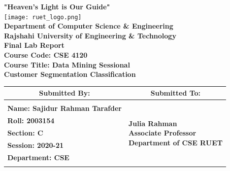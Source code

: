 \documentclass[12pt,a4paper]{article}
\begin{document}

\begin{titlepage}
    \thispagestyle{empty}
    \centering
    \vspace*{0.5cm}
    
    {\large \textbf{"Heaven's Light is Our Guide"}}\\[0.3cm]
    
    \texttt{[image: ruet\_logo.png]} \\[0.4cm]
    
    {\Large \textbf{Department of Computer Science \& Engineering}}\\[0.3cm]
    {\large \textbf{Rajshahi University of Engineering \& Technology}}\\[0.8cm]

    \vspace{0.8cm}
    {\LARGE \textbf{Final Lab Report}}\\[0.4cm]

    \vspace{0.8cm}
    {\Large \textbf{Course Code: CSE 4120}}\\[0.3cm]
    {\Large \textbf{Course Title: Data Mining Sessional}}\\[0.4cm]
    {\LARGE \textbf{Customer Segmentation Classification}}\\[0.8cm]
    
    
    \begin{table}[h!]
    \centering
    \setlength{\arrayrulewidth}{1.5pt}
    \renewcommand{\arraystretch}{1.5}
    \begin{tabular}{|p{8.5cm}|p{6.5cm}|}
        \hline
        \multicolumn{1}{|c|}{\large \textbf{Submitted By:}} & \multicolumn{1}{c|}{\large \textbf{Submitted To:}} \\
        \hline
        & \\
        \large \textbf{Name: Sajidur Rahman Tarafder} & \multirow{5}{*}{\parbox{6.5cm}{\centering 
        \large \textbf{Julia Rahman} \\ 
        \vspace{0.2cm}
        \large \textbf{Associate Professor} \\ 
        \vspace{0.2cm}
        \large \textbf{Department of CSE RUET} \\ 
        \vspace{0.4cm}}} \\
        \large \textbf{Roll: 2003154} & \\
        \large \textbf{Section: C} & \\
        \large \textbf{Session: 2020-21} & \\
        \large \textbf{Department: CSE} & \\
        & \\
        \hline
    \end{tabular}
    \end{table}
    

\end{titlepage}
\end{document}
